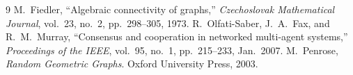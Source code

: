 \documentclass[11pt,a4paper]{article}
\begin{document}
\begin{thebibliography}{9}
 M.~Fiedler, ``Algebraic connectivity of graphs,''
  \emph{Czechoslovak Mathematical Journal}, vol.~23, no.~2, pp.~298--305, 1973.
 R.~Olfati-Saber, J.~A.~Fax, and R.~M.~Murray, ``Consensus and
  cooperation in networked multi-agent systems,'' \emph{Proceedings of the
  IEEE}, vol.~95, no.~1, pp.~215--233, Jan.~2007.
 M.~Penrose, \emph{Random Geometric Graphs}. Oxford University
  Press, 2003.
\end{thebibliography}
\end{document}
